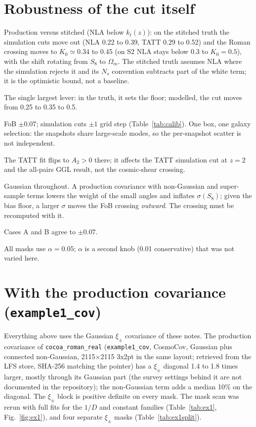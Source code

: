 \documentclass[11pt]{article}
\begin{document}
\section{Robustness of the cut itself}
\begin{description}[leftmargin=1.2em,itemsep=2pt]
\item[Truth.] Production versus stitched (NLA below $k_t(z)$): on the
  stitched truth the simulation cuts move out (NLA 0.22 to 0.39, TATT 0.29 to
  0.52) and the Roman crossing moves to $K_0 \simeq 0.34$ to 0.45 (on S2 NLA
  stays below 0.3 to $K_0 = 0.5$), with the shift rotating from $S_8$ to
  $\Omega_m$. The stitched truth assumes NLA
  where the simulation rejects it and its $N_s$ convention subtracts part of
  the white term; it is the optimistic bound, not a baseline.
\item[White term.] The single largest lever: in the truth, it sets the
  floor; modelled, the cut moves from 0.25 to 0.35 to 0.5.
\item[Simulation noise.] FoB $\pm0.07$; simulation cuts $\pm1$ grid step
  (Table~\ref{tab:calib}). One box, one galaxy selection: the snapshots share
  large-scale modes, so the per-snapshot scatter is not independent.
\item[$z = 2$.] The TATT fit flips to $A_2 > 0$ there; it affects the TATT
  simulation cut at $z = 2$ and the all-pairs GGL result, not the cosmic-shear
  crossing.
\item[Covariance.] Gaussian throughout. A production covariance with
  non-Gaussian and super-sample terms lowers the weight of the small angles
  and inflates $\sigma(S_8)$; given the bias floor, a larger $\sigma$ moves the
  FoB crossing \emph{outward}. The crossing must be recomputed with it.
\item[Parameter space.] Cases A and B agree to $\pm0.07$.
\item[$\alpha$.] All masks use $\alpha = 0.05$; $\alpha$ is a second knob
  (0.01 conservative) that was not varied here.
\end{description}

\section{With the production covariance (\texttt{example1\_cov})}\label{sec:ex1}
Everything above uses the Gaussian $\xi_\pm$ covariance of these notes. The
production covariance of \texttt{cocoa\_roman\_real} (\texttt{example1\_cov},
CosmoCov, Gaussian plus connected non-Gaussian, 2115$\times$2115 3x2pt in the
same layout; retrieved from the LFS store, SHA-256 matching the pointer) has a
$\xi_\pm$ diagonal 1.4 to 1.8 times larger, mostly through its Gaussian part
(the survey settings behind it are not documented in the repository); the
non-Gaussian term adds a median 10\% on the diagonal. The $\xi_\pm$ block is
positive definite on every mask. The mask scan was rerun with full fits for
the $1/D$ and constant families (Table~\ref{tab:ex1}, Fig.~\ref{fig:ex1}), and
four separate $\xi_\pm$ masks (Table~\ref{tab:ex1split}).
\end{document}
